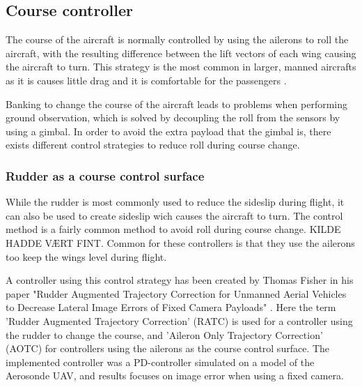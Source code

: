 \subsection{Course controller}
The course of the aircraft is normally controlled by using the ailerons to roll the aircraft, with the resulting difference between the lift vectors of each wing causing the aircraft to turn. This strategy is the most common in larger, manned aircrafts as it is causes little drag and it is comfortable for the passengers \cite{skidToTurnMills}.

Banking to change the course of the aircraft leads to problems when performing ground observation, which is solved by decoupling the roll from the sensors by using a gimbal. In order to avoid the extra payload that the gimbal is, there exists different control strategies to reduce roll during course change.


\subsubsection{Rudder as a course control surface}
While the rudder is most commonly used to reduce the sideslip during flight, it can also be used to create sideslip wich causes the aircraft to turn. The control method is a fairly common method to avoid roll during course change. KILDE HADDE VÆRT FINT. Common for these controllers is that they use the ailerons too keep the wings level during flight.

A controller using this control strategy has been created by Thomas Fisher in his paper "Rudder Augmented Trajectory Correction for Unmanned Aerial Vehicles to Decrease Lateral Image Errors of Fixed Camera Payloads" \cite{ratcFISHER}. Here the term 'Rudder Augmented Trajectory Correction' (RATC) is used for a controller using the rudder to change the course, and 'Aileron Only Trajectory Correction' (AOTC) for controllers using the ailerons as the course control surface. The implemented controller was a PD-controller simulated on a model of the Aerosonde UAV, and results focuses on image error when using a fixed camera.


